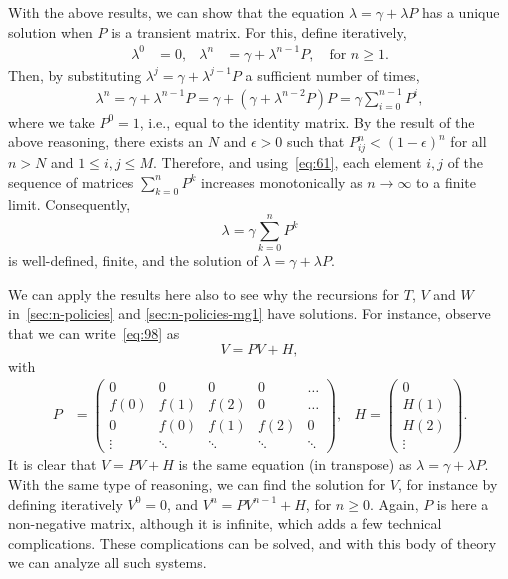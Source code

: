 With the above results, we can show that the equation $\lambda = \gamma + \lambda P$ has a unique solution when $P$ is a transient matrix. For this, define iteratively, 
\begin{align*}
  \lambda^0 &= 0, & \lambda^n &= \gamma + \lambda^{n-1}P, \quad\text{for } n\geq 1.
\end{align*}
Then, by substituting $\lambda^j = \gamma + \lambda^{j-1} P$ a sufficient number of times, 
\begin{align*}
  \lambda^n = \gamma + \lambda^{n-1} P = \gamma + (\gamma + \lambda^{n-2}P) P = \gamma \sum_{i=0}^{n-1} P^i,
\end{align*}
where we take $P^0=1$, i.e., equal to the identity matrix.
By the result of the above reasoning, there exists an $N$ and $\epsilon>0$ such that $P_{i j}^n < (1-\epsilon)^n$ for all $n>N$ and $1\leq i, j \leq M$.
Therefore, and using~\cref{eq:61}, each element $i, j$ of the sequence of matrices $\sum_{k=0}^n P^k $ increases monotonically as $n\to\infty$ to a finite limit.
Consequently,
\begin{equation}
  \label{eq:g-103}
  \lambda = \gamma \sum_{k=0}^n P^k 
\end{equation}
is well-defined, finite, and the solution of $\lambda = \gamma + \lambda P$. 


We can apply the results here also to see why the recursions for $T$, $V$ and $W$ in~\cref{sec:n-policies} and \cref{sec:n-policies-mg1} have solutions.
For instance, observe that we can write~\cref{eq:98} as
\begin{equation*}
V = PV + H,
\end{equation*}
with \begin{align*}
  P &=
  \begin{pmatrix}
    0 & 0 & 0 & 0&  \hdots\\
    f(0) & f(1) & f(2) & 0 & \hdots \\
    0 & f(0)& f(1) & f(2) & 0 \\
    \vdots & \ddots & \ddots & \ddots& \ddots
  \end{pmatrix},
& H =
                   \begin{pmatrix}
                     0 \\
                     H(1)\\
                     H(2)\\
                     \vdots
                   \end{pmatrix}.
\end{align*}
It is clear that $V=PV + H$ is the same equation (in transpose) as $\lambda = \gamma + \lambda P$.
With the same type of reasoning, we can find the solution for $V$, for instance by defining iteratively $V^0 = 0$, and $V^n = PV^{n-1} + H$, for $n\geq 0$.
Again, $P$ is here a non-negative matrix, although it is infinite, which adds a few technical complications.
These complications can be solved, and with this body of theory we can analyze all such systems.



